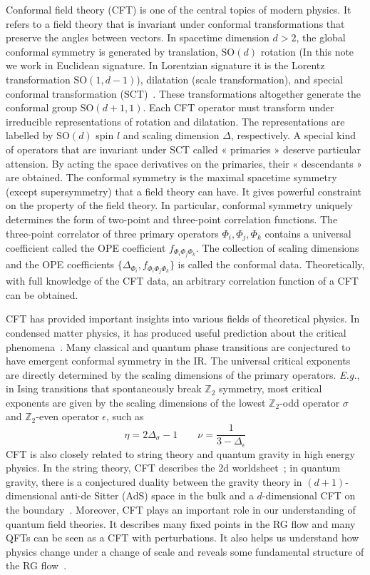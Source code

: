 \documentclass{timesjhep}
\begin{document}
Conformal field theory (CFT) is one of the central topics of modern physics. It refers to a field theory that is invariant under conformal transformations that preserve the angles between vectors. In spacetime dimension $d>2$, the global conformal symmetry is generated by translation, $\mathrm{SO}(d)$ rotation (In this note we work in Euclidean signature. In Lorentzian signature it is the Lorentz transformation $\mathrm{SO}(1,d-1)$), dilatation (scale transformation), and special conformal transformation (SCT)~\cite{Rychkov2016CFT,SimmonsDuffin2016CFT}. These transformations altogether generate the conformal group $\mathrm{SO}(d+1,1)$. Each CFT operator must transform under irreducible representations of rotation and dilatation. The representations are labelled by $\mathrm{SO}(d)$ spin $l$ and scaling dimension $\Delta$, respectively. A special kind of operators that are invariant under SCT called « primaries » deserve particular attension. By acting the space derivatives on the primaries, their « descendants » are obtained. The conformal symmetry is the maximal spacetime symmetry (except supersymmetry) that a field theory can have. It gives powerful constraint on the property of the field theory. In particular, conformal symmetry uniquely determines the form of two-point and three-point correlation functions. The three-point correlator of three primary operators $\Phi_i,\Phi_j,\Phi_k$ contains a universal coefficient called the OPE coefficient $f_{\Phi_i\Phi_j\Phi_k}$. The collection of scaling dimensions and the OPE coefficients $\{\Delta_{\Phi_i},f_{\Phi_i\Phi_j\Phi_k}\}$ is called the conformal data. Theoretically, with full knowledge of the CFT data, an arbitrary correlation function of a CFT can be obtained. 

CFT has provided important insights into various fields of theoretical physics. In condensed matter physics, it has produced useful prediction about the critical phenomena~\cite{Polyakov1970Conformal,Cardy1996Scaling}. Many classical and quantum phase transitions are conjectured to have emergent conformal symmetry in the IR. The universal critical exponents are directly determined by the scaling dimensions of the primary operators. \textit{E.g.}, in Ising transitions that spontaneously break $\mathbb{Z}_2$ symmetry, most critical exponents are given by the scaling dimensions of the lowest $\mathbb{Z}_2$-odd operator $\sigma$ and $\mathbb{Z}_2$-even operator $\epsilon$, such as \begin{equation} \eta=2\Delta_\sigma-1\qquad\nu=\frac{1}{3-\Delta_\epsilon} \end{equation} CFT is also closely related to string theory and quantum gravity in high energy physics. In the string theory, CFT describes the 2d worldsheet~; in quantum gravity, there is a conjectured duality between the gravity theory in $(d+1)$-dimensional anti-de Sitter (AdS) space in the bulk and a $d$-dimensional CFT on the boundary~\cite{Maldacena1998AdSCFT}. Moreover, CFT plays an important role in our understanding of quantum field theories. It describes many fixed points in the RG flow and many QFTs can be seen as a CFT with perturbations. It also helps us understand how physics change under a change of scale and reveals some fundamental structure of the RG flow~\cite{Zamolodchikov1986Irreversibility}. 
\end{document}
